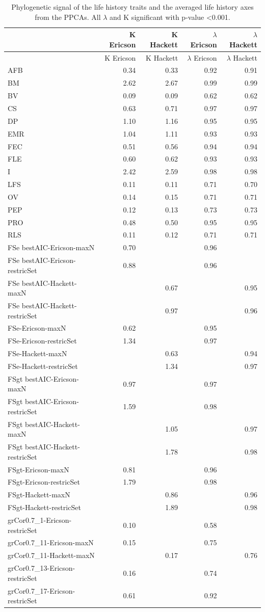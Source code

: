 \clearpage%
\begin{footnotesize}
\begin{longtable}{@{}lrrrr@{}}
\caption[Phylogenetic signal]{
Phylogenetic signal of the life history traits and the averaged life history
axes from the PPCAs. All $\lambda$ and K significant with p-value
\textless{0.001}.}
\label{tab:tabApp2.7}\\
\toprule
  & K Ericson & K Hackett & $\lambda$ Ericson & $\lambda$ Hackett\tabularnewline
\midrule
\endfirsthead
\toprule
  & K Ericson & K Hackett & $\lambda$ Ericson & $\lambda$ Hackett\tabularnewline
\midrule
\endhead
AFB & 0.34 & 0.33 & 0.92 & 0.91\tabularnewline
BM & 2.62 & 2.67 & 0.99 & 0.99\tabularnewline
BV & 0.09 & 0.09 & 0.62 & 0.62\tabularnewline
CS & 0.63 & 0.71 & 0.97 & 0.97\tabularnewline
DP & 1.10 & 1.16 & 0.95 & 0.95\tabularnewline
EMR & 1.04 & 1.11 & 0.93 & 0.93\tabularnewline
FEC & 0.51 & 0.56 & 0.94 & 0.94\tabularnewline
FLE & 0.60 & 0.62 & 0.93 & 0.93\tabularnewline
I & 2.42 & 2.59 & 0.98 & 0.98\tabularnewline
LFS & 0.11 & 0.11 & 0.71 & 0.70\tabularnewline
OV & 0.14 & 0.15 & 0.71 & 0.71\tabularnewline
PEP & 0.12 & 0.13 & 0.73 & 0.73\tabularnewline
PRO & 0.48 & 0.50 & 0.95 & 0.95\tabularnewline
RLS & 0.11 & 0.12 & 0.71 & 0.71\tabularnewline
FSe bestAIC-Ericson-maxN & 0.70 &  & 0.96 & \tabularnewline
FSe bestAIC-Ericson-restricSet & 0.88 &  & 0.96 & \tabularnewline
FSe bestAIC-Hackett-maxN &  & 0.67 &  & 0.95\tabularnewline
FSe bestAIC-Hackett-restricSet &  & 0.97 &  & 0.96\tabularnewline
FSe-Ericson-maxN & 0.62 &  & 0.95 & \tabularnewline
FSe-Ericson-restricSet & 1.34 &  & 0.97 & \tabularnewline
FSe-Hackett-maxN &  & 0.63 &  & 0.94\tabularnewline
FSe-Hackett-restricSet &  & 1.34 &  & 0.97\tabularnewline
FSgt bestAIC-Ericson-maxN & 0.97 &  & 0.97 & \tabularnewline
FSgt bestAIC-Ericson-restricSet & 1.59 &  & 0.98 & \tabularnewline
FSgt bestAIC-Hackett-maxN &  & 1.05 &  & 0.97\tabularnewline
FSgt bestAIC-Hackett-restricSet &  & 1.78 &  & 0.98\tabularnewline
FSgt-Ericson-maxN & 0.81 &  & 0.96 & \tabularnewline
FSgt-Ericson-restricSet & 1.79 &  & 0.98 & \tabularnewline
FSgt-Hackett-maxN &  & 0.86 &  & 0.96\tabularnewline
FSgt-Hackett-restricSet &  & 1.89 &  & 0.98\tabularnewline
grCor0.7\_1-Ericson-restricSet & 0.10 &  & 0.58 & \tabularnewline
grCor0.7\_11-Ericson-maxN & 0.15 &  & 0.75 & \tabularnewline
grCor0.7\_11-Hackett-maxN &  & 0.17 &  & 0.76\tabularnewline
grCor0.7\_13-Ericson-restricSet & 0.16 &  & 0.74 & \tabularnewline
grCor0.7\_17-Ericson-restricSet & 0.61 &  & 0.92 & \tabularnewline

\end{longtable}
\end{footnotesize}
